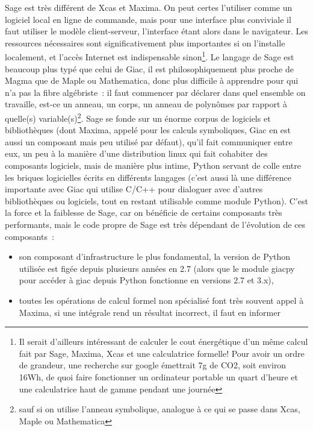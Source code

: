 \documentclass[a4paper,11pt]{article}
\begin{document}
\begin{giacjshere}
Sage est tr\`es diff\'erent de Xcas et Maxima. On peut certes l'utiliser
comme un logiciel local en ligne de commande, mais
pour une interface plus conviviale il faut utiliser le mod\`ele
client-serveur, l'interface \'etant alors dans le navigateur. Les
ressources n\'ecessaires sont significativement plus importantes
si on l'installe localement, et l'acc\`es Internet est indispensable
sinon\footnote{Il serait d'ailleurs int\'eressant de calculer le 
cout \'energ\'etique d'un m\^eme calcul fait par Sage, Maxima, 
Xcas et une calculatrice formelle! Pour avoir un ordre
de grandeur, une recherche sur google \'emettrait 7g de CO2, 
soit environ 16Wh, de quoi faire fonctionner un ordinateur 
portable un quart d'heure et une calculatrice haut de gamme
pendant une journ\'ee}. Le langage de 
Sage est beaucoup plus typ\'e que celui de Giac, il est
philosophiquement
plus proche de Magma que de Maple ou Mathematica,
donc plus difficile \`a apprendre pour qui n'a pas la fibre 
alg\'ebriste~: il faut commencer par d\'eclarer dans quel
ensemble on travaille, est-ce un anneau, un corps, un anneau
de polyn\^omes par rapport \`a quelle(s) variable(s)\footnote{sauf si
on utilise l'anneau symbolique, analogue \`a ce qui se passe
dans Xcas, Maple ou Mathematica}.
Sage se fonde sur un \'enorme corpus de logiciels et
biblioth\`eques (dont Maxima, appel\'e pour les calculs symboliques,
Giac en est aussi un composant mais peu utilis\'e par d\'efaut), 
qu'il fait communiquer entre eux, un peu \`a la
mani\`ere d'une distribution linux qui fait cohabiter des composants
logiciels, mais de mani\`ere plus intime, Python servant
de colle entre les briques logicielles \'ecrits en diff\'erents
langages (c'est aussi l\`a une diff\'erence importante avec Giac
qui utilise C/C++ pour dialoguer avec d'autres biblioth\`eques
ou logiciels, tout en restant utilisable comme module
Python). C'est la force et la
faiblesse de Sage, car on b\'en\'eficie de certains composants tr\`es
performants, mais le code propre de Sage est tr\`es d\'ependant
de l'\'evolution de ces composants~:
\begin{itemize}
\item son composant d'infrastructure le plus fondamental, 
la version de Python utilis\'ee est
fig\'ee depuis plusieurs ann\'ees en 2.7 (alors que le module
giacpy pour acc\'eder \`a giac depuis Python fonctionne
en versions 2.7 et 3.x),
\item toutes les op\'erations de calcul formel non
sp\'ecialis\'e font tr\`es souvent appel \`a Maxima,
si une int\'egrale rend un r\'esultat incorrect, il faut en informer

\end{itemize}
\end{giacjshere}
\end{document}
